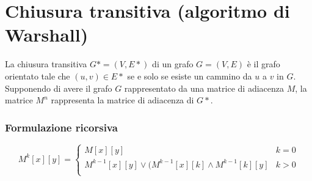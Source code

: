 \section{Chiusura transitiva (algoritmo di Warshall)}
La chiusura transitiva $G* = (V, E*)$ di un grafo $G = (V, E)$ \`e il grafo orientato tale che $(u, v)\in E*$ se e solo se esiste un cammino da $u$ a $v$ in $G$. Supponendo di avere il
grafo $G$ rappresentato da una matrice di adiacenza $M$, la matrice $M^n$ rappresenta la matrice di adiacenza di $G*$.
\subsubsection{Formulazione ricorsiva}
$$M^k[x][y] = \begin{cases}
	M[x][y] & k = 0\\
	M^{k-1}[x][y]\lor (M^{k-1}[x][k]\land M^{k-1}[k][y] & k>0\\
\end{cases}$$
